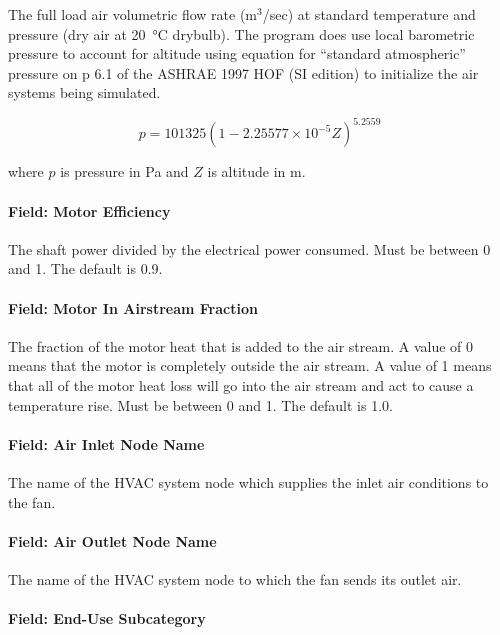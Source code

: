 The full load air volumetric flow rate (m\(^{3}\)/sec) at standard temperature and pressure (dry air at \SI{20}{\celsius} drybulb). The program does use local barometric pressure to account for altitude using equation for ``standard atmospheric'' pressure on p 6.1 of the ASHRAE 1997 HOF (SI edition) to initialize the air systems being simulated.

\begin{equation}
p = 101325 \left(1 - 2.25577 \times 10^{-5} Z\right)^{5.2559}
\end{equation}

where \(p\) is pressure in Pa and \(Z\) is altitude in m.

\paragraph{Field: Motor Efficiency}\label{field-motor-efficiency}

The shaft power divided by the electrical power consumed. Must be between 0 and 1. The default is 0.9.

\paragraph{Field: Motor In Airstream Fraction}\label{field-motor-in-airstream-fraction}

The fraction of the motor heat that is added to the air stream. A value of 0 means that the motor is completely outside the air stream. A value of 1 means that all of the motor heat loss will go into the air stream and act to cause a temperature rise. Must be between 0 and 1. The default is 1.0.

\paragraph{Field: Air Inlet Node Name}\label{field-air-inlet-node-name-002}

The name of the HVAC system node which supplies the inlet air conditions to the fan.

\paragraph{Field: Air Outlet Node Name}\label{field-air-outlet-node-name-002}

The name of the HVAC system node to which the fan sends its outlet air.

\paragraph{Field: End-Use Subcategory}\label{field-end-use-subcategory-001}

